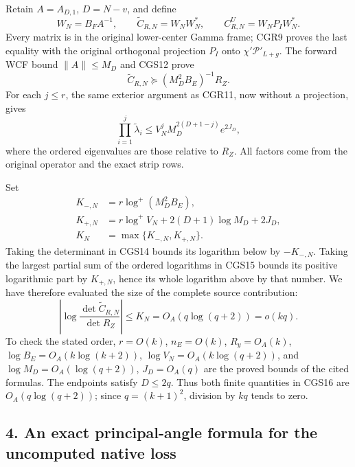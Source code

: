 Retain \(A=A_{D,1}\), \(D=N-v\), and define \[
W_N=B_FA^{-1},\qquad
\widetilde C_{R,N}=W_NW_N^*,\qquad
C_{R,N}^U=W_NP_IW_N^*.
\tag{CGS13}
\] Every matrix is in the original lower-center Gamma frame; CGR9 proves the last equality with the original orthogonal projection \(P_I\) onto \(\chi'\mathcal P'_{L+g}\). The forward WCF bound \(\|A\|\le M_D\) and CGS12 prove \[
\widetilde C_{R,N}\succeq
           (M_D^2B_E)^{-1}R_Z.
\tag{CGS14}
\] For each \(j\le r\), the same exterior argument as CGR11, now without a projection, gives \[
\prod_{i=1}^j\widetilde\lambda_i
\le V_N^jM_D^{2(D+1-j)}e^{2J_D},
\tag{CGS15}
\] where the ordered eigenvalues are those relative to \(R_Z\). All factors come from the original operator and the exact strip rows.

Set \[
\begin{split}
K_{-,N}&=r\log^+(M_D^2B_E),\\
K_{+,N}&=r\log^+V_N+2(D+1)\log M_D+2J_D,\\
K_N&=\max\{K_{-,N},K_{+,N}\}.
\end{split}\tag{CGS16}
\] Taking the determinant in CGS14 bounds its logarithm below by \(-K_{-,N}\). Taking the largest partial sum of the ordered logarithms in CGS15 bounds its positive logarithmic part by \(K_{+,N}\), hence its whole logarithm above by that number. We have therefore evaluated the size of the complete source contribution: \[
\boxed{\left|\log\frac{\det\widetilde C_{R,N}}{\det R_Z}\right|
\le K_N=O_A(q\log(q+2))=o(kq).}
\tag{CGS17}
\] To check the stated order, \(r=O(k)\), \(n_E=O(k)\), \(R_y=O_A(k)\), \(\log B_E=O_A(k\log(k+2))\), \(\log V_N=O_A(k\log(q+2))\), and \(\log M_D=O_A(\log(q+2))\), \(J_D=O_A(q)\) are the proved bounds of the cited formulas. The endpoints satisfy \(D\le2q\). Thus both finite quantities in CGS16 are \(O_A(q\log(q+2))\); since \(q=(k+1)^2\), division by \(kq\) tends to zero.

\subsection{4. An exact principal-angle formula for the uncomputed native loss}\label{an-exact-principal-angle-formula-for-the-uncomputed-native-loss}

